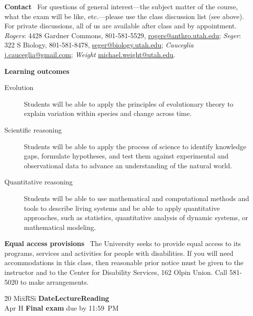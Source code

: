 \documentclass[11pt]{article}
\newcommand{\heading}[1]{\bigskip\noindent\textbf{#1}~}
\begin{document}
\heading{Contact} For questions of general interest---the subject
matter of the course, what the exam will be like, etc.---please use
the class discussion list (see above). For private discussions, all of
us are available after class and by appointment. \emph{Rogers}: 4428
Gardner Commons, 801-581-5529, \url{rogers@anthro.utah.edu};
\emph{Seger}: 322 S Biology, 801-581-8478,
\url{seger@biology.utah.edu}; \emph{Cauceglia}
\url{j.cauceglia@gmail.com}; \emph{Weight}
\url{michael.weight@utah.edu}.


\heading{Learning outcomes}
\begin{description}
\item[Evolution] Students will be able to apply the principles of
  evolutionary theory to explain variation within species and change
  across time.

\item[Scientific reasoning] Students will be able to apply the process
  of science to identify knowledge gaps, formulate hypotheses, and
  test them against experimental and observational data to advance an
  understanding of the natural world.

\item[Quantitative reasoning] Students will be able to use
  mathematical and computational methods and tools to describe living
  systems and be able to apply quantitative approaches, such as
  statistics, quantitative analysis of dynamic systems, or
  mathematical modeling.
\end{description}

\heading{Equal access provisions} The University seeks to provide
equal access to its programs, services and activities for people with
disabilities.  If you will need accommodations in this class, then
reasonable prior notice must be given to the instructor and to the
Center for Disability Services, 162 Olpin Union. Call 581-5020 to
make arrangements.

\begin{tabbing}
\hspace*{.05\textwidth}\=20 Mix\=\hspace{.5\textwidth}\=RSi\=\kill
\textbf{Date}\>\>\textbf{Lecture}\>\>\textbf{Reading}\\

Apr  H\> \textbf{Final exam} due by 11:59~PM\\
\end{tabbing}



\end{document}
